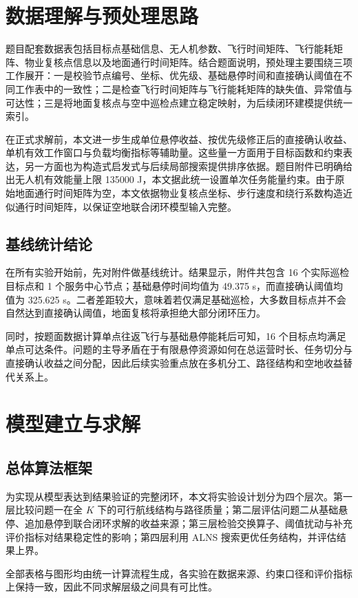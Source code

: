\documentclass[12pt]{article}
\begin{document}
\section{数据理解与预处理思路}
题目配套数据表包括目标点基础信息、无人机参数、飞行时间矩阵、飞行能耗矩阵、物业复核点信息以及地面通行时间矩阵。结合题面说明，预处理主要围绕三项工作展开：一是校验节点编号、坐标、优先级、基础悬停时间和直接确认阈值在不同工作表中的一致性；二是检查飞行时间矩阵与飞行能耗矩阵的缺失值、异常值与可达性；三是将地面复核点与空中巡检点建立稳定映射，为后续闭环建模提供统一索引。

在正式求解前，本文进一步生成单位悬停收益、按优先级修正后的直接确认收益、单机有效工作窗口与负载均衡指标等辅助量。这些量一方面用于目标函数和约束表达，另一方面也为构造式启发式与后续局部搜索提供排序依据。题目附件已明确给出无人机有效能量上限 135000 J，本文据此统一设置单次任务能量约束。由于原始地面通行时间矩阵为空，本文依据物业复核点坐标、步行速度和绕行系数构造近似通行时间矩阵，以保证空地联合闭环模型输入完整。

\subsection{基线统计结论}
在所有实验开始前，先对附件做基线统计。结果显示，附件共包含 16 个实际巡检目标点和 1 个服务中心节点；基础悬停时间均值为 49.375 s，而直接确认阈值均值为 325.625 s。二者差距较大，意味着若仅满足基础巡检，大多数目标点并不会自然达到直接确认阈值，地面复核将承担绝大部分闭环压力。

同时，按题面数据计算单点往返飞行与基础悬停能耗后可知，16 个目标点均满足单点可达条件。问题的主导矛盾在于有限悬停资源如何在总运营时长、任务切分与直接确认收益之间分配，因此后续实验重点放在多机分工、路径结构和空地收益替代关系上。

\section{模型建立与求解}

\subsection{总体算法框架}
为实现从模型表达到结果验证的完整闭环，本文将实验设计划分为四个层次。第一层比较问题一在全 $K$ 下的可行航线结构与路径质量；第二层评估问题二从基础悬停、追加悬停到联合闭环求解的收益来源；第三层检验交换算子、阈值扰动与补充评价指标对结果稳定性的影响；第四层利用 ALNS 搜索更优任务结构，并评估结果上界。

全部表格与图形均由统一计算流程生成，各实验在数据来源、约束口径和评价指标上保持一致，因此不同求解层级之间具有可比性。
\end{document}
